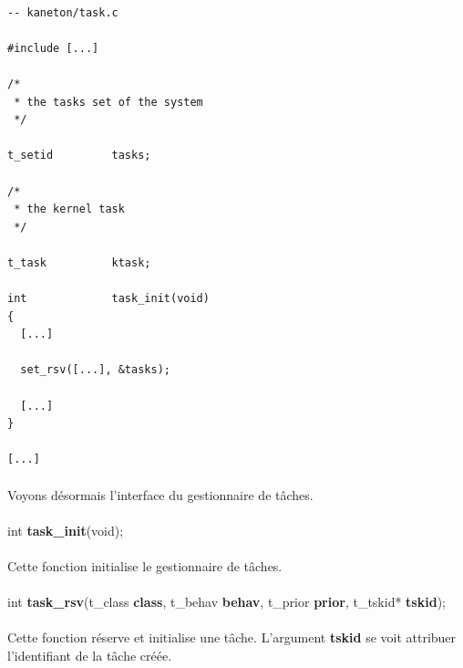 \documentclass[10pt,a4wide]{article}
\begin{document}
\begin{verbatim}

-- kaneton/task.c

#include [...]

/*
 * the tasks set of the system
 */

t_setid         tasks;

/*
 * the kernel task
 */

t_task          ktask;

int             task_init(void)
{
  [...]

  set_rsv([...], &tasks);

  [...]
}

[...]

\end{verbatim}

\paragraph{}

Voyons d\'esormais l'interface du gestionnaire de t\^aches.

\paragraph{}

\hspace{1.5cm}int \textbf{task\_init}(void);

\paragraph{}

Cette fonction initialise le gestionnaire de t\^aches.

\paragraph{}

\hspace{1.5cm}int \textbf{task\_rsv}(t\_class \textbf{class},
                                     t\_behav \textbf{behav},
                                     t\_prior \textbf{prior},
                                     t\_tskid* \textbf{tskid});

\paragraph{}

Cette fonction r\'eserve  et initialise une t\^ache. L'argument
\textbf{tskid} se voit attribuer l'identifiant de la t\^ache cr\'e\'ee.
\end{document}
